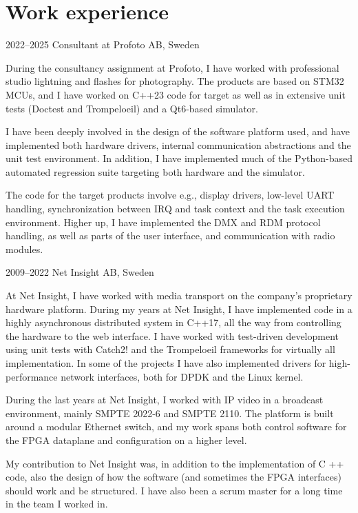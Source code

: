 \documentclass[a4paper]{article}
\begin{document}
\section{Work experience}

\begin{CV}
\item[2022--2025] Consultant at Profoto AB, Sweden

During the consultancy assignment at Profoto, I have worked with professional studio lightning
and flashes for photography. The products are based on STM32 MCUs, and I have worked on C++23
code for target as well as in extensive unit tests (Doctest and Trompeloeil) and a Qt6-based
simulator.

I have been deeply involved in the design of the software platform used, and have implemented
both hardware drivers, internal communication abstractions and the unit test environment. In
addition, I have implemented much of the Python-based automated regression suite targeting
both hardware and the simulator.

The code for the target products involve e.g., display drivers, low-level UART handling,
synchronization between IRQ and task context and the task execution environment. Higher up,
I have implemented the DMX and RDM protocol handling, as well as parts of the user
interface, and communication with radio modules.

\item[2009--2022] Net Insight AB, Sweden
  
At Net Insight, I have worked with media transport on the company's proprietary hardware
platform. During my years at Net Insight, I have implemented code in a highly asynchronous
distributed system in C++17, all the way from controlling the hardware to the web interface.
I have worked with test-driven development using unit tests with Catch2! and the Trompeloeil
frameworks for virtually all implementation. In some of the projects I have also implemented
drivers for high-performance network interfaces, both for DPDK and the Linux kernel.

During the last years at Net Insight, I worked with IP video in a broadcast environment,
mainly SMPTE 2022-6 and SMPTE 2110. The platform is built around a modular Ethernet switch,
and my work spans both control software for the FPGA dataplane and configuration on a higher
level.

My contribution to Net Insight was, in addition to the implementation of C ++ code, also the
design of how the software (and sometimes the FPGA interfaces) should work and be structured.
I have also been a scrum master for a long time in the team I worked in.


\end{CV}
\end{document}
